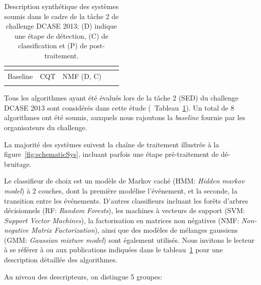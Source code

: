 \begin{table}[t]
\begin{center}
\begin{tabular}{lcccc}
\citep{VVK,gemmeke2013exemplar}     &                      &                              &           &             \\    
\hline
Baseline                            & CQT                  & NMF \hfill  (D, C)           &           &             \\ 
\citep{Giannoulis:2013a}            &                      &                              &           &             \\  
\hline      
\end{tabular}
\end{center}
\caption[Description synthétique des systèmes soumis dans le cadre de la tâche 2 de challenge DCASE 2013.]{Description synthétique des systèmes soumis dans le cadre de la tâche 2 de challenge DCASE 2013; (D) indique une étape de détection, (C) de classification et (P) de post-traitement.}
\label{tab:systemsDcase2013}
\end{table}

Tous les algorithmes ayant été évalués lors de la tâche 2 (SED) du challenge DCASE 2013 sont considérés dans cette étude (\cf~Tableau~\ref{tab:systemsDcase2013}). Un total de 8 algorithmes ont été soumis, auxquels nous rajoutons la \emph{baseline} fournie par les organisateurs du challenge.

La majorité des systèmes suivent la chaîne de traitement illustrée à la figure~\ref{fig:schematicSys}, incluant parfois une étape pré-traitement de dé-bruitage.

Le classifieur de choix est un modèle de Markov caché (HMM: \emph{Hidden markov model}) \citep{Rabiner1989} à 2 couches, dont la première modélise l'événement, et la seconde, la transition entre les événements. D'autres classifieurs incluant les forêts d'arbres décisionnels (RF: \emph{Random Forests}), les machines à vecteurs de support (SVM: \emph{Support Vector Machines}), la factorisation en matrices non négatives (NMF: \emph{Non-negative Matrix Factorization}), ainsi que des modèles de mélanges gaussiens (GMM: \emph{Gaussian mixture model}) sont également utilisés. Nous invitons le lecteur à se référer à \citep{Stowell15} ou aux publications indiquées dans le tableau~\ref{tab:systemsDcase2013} pour une description détaillée des algorithmes.

Au niveau des descripteurs, on distingue 5 groupes:

